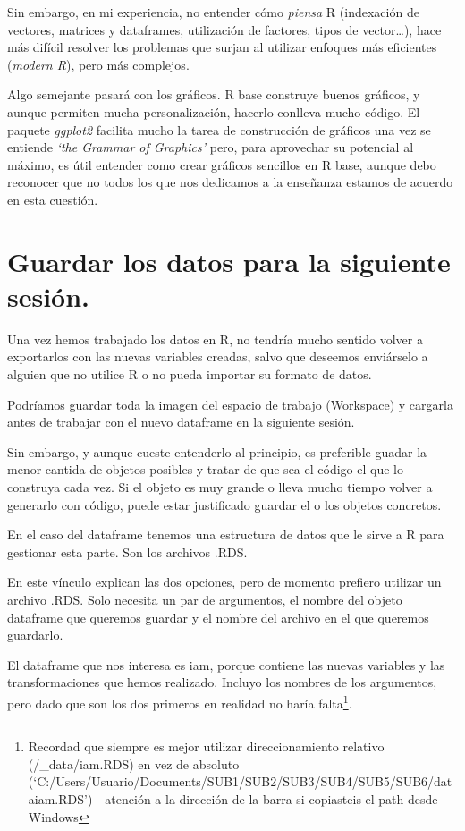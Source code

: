 \documentclass[
  letterpaper,
  DIV=11,
  numbers=noendperiod]{scrreprt}
\begin{document}
Sin embargo, en mi experiencia, no entender cómo \emph{piensa} R
(indexación de vectores, matrices y dataframes, utilización de factores,
tipos de vector\ldots), hace más difícil resolver los problemas que
surjan al utilizar enfoques más eficientes (\emph{modern R}), pero más
complejos.

Algo semejante pasará con los gráficos. R base construye buenos
gráficos, y aunque permiten mucha personalización, hacerlo conlleva
mucho código. El paquete \emph{ggplot2} facilita mucho la tarea de
construcción de gráficos una vez se entiende \emph{`the Grammar of
Graphics'} pero, para aprovechar su potencial al máximo, es útil
entender como crear gráficos sencillos en R base, aunque debo reconocer
que no todos los que nos dedicamos a la enseñanza estamos de acuerdo en
esta cuestión.

\hypertarget{guardar-los-datos-para-la-siguiente-sesiuxf3n.-1}{%
\section{Guardar los datos para la siguiente
sesión.}\label{guardar-los-datos-para-la-siguiente-sesiuxf3n.-1}}

Una vez hemos trabajado los datos en R, no tendría mucho sentido volver
a exportarlos con las nuevas variables creadas, salvo que deseemos
enviárselo a alguien que no utilice R o no pueda importar su formato de
datos.

Podríamos guardar toda la imagen del espacio de trabajo (Workspace) y
cargarla antes de trabajar con el nuevo dataframe en la siguiente
sesión.

Sin embargo, y aunque cueste entenderlo al principio, es preferible
guadar la menor cantida de objetos posibles y tratar de que sea el
código el que lo construya cada vez. Si el objeto es muy grande o lleva
mucho tiempo volver a generarlo con código, puede estar justificado
guardar el o los objetos concretos.

En el caso del dataframe tenemos una estructura de datos que le sirve a
R para gestionar esta parte. Son los archivos .RDS.

En este vínculo explican las dos opciones, pero de momento prefiero
utilizar un archivo .RDS. Solo necesita un par de argumentos, el nombre
del objeto dataframe que queremos guardar y el nombre del archivo en el
que queremos guardarlo.

El dataframe que nos interesa es iam, porque contiene las nuevas
variables y las transformaciones que hemos realizado. Incluyo los
nombres de los argumentos, pero dado que son los dos primeros en
realidad no haría falta\footnote{Recordad que siempre es mejor utilizar
  direccionamiento relativo (/\_data/iam.RDS) en vez de absoluto
  (`C:/Users/Usuario/Documents/SUB1/SUB2/SUB3/SUB4/SUB5/SUB6/dataiam.RDS')
  - atención a la dirección de la barra si copiasteis el path desde
  Windows}.
\end{document}
